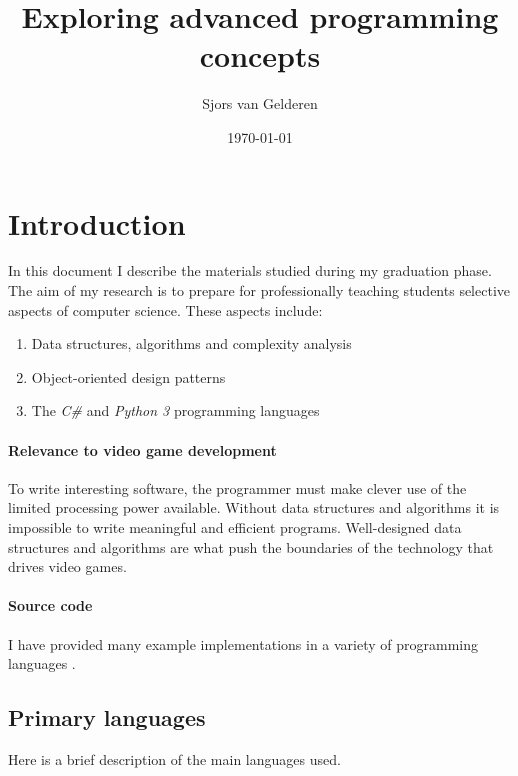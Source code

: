\documentclass{article}
\author{Sjors van Gelderen}
\title{Exploring advanced programming concepts}
\date{\today{}}
\begin{document}
\maketitle{}


\newpage


\tableofcontents{}


\newpage


\section{Introduction}
In this document I describe the materials studied during my graduation phase. The aim of my research is to prepare
for professionally teaching students selective aspects of computer science. These aspects include:
\begin{enumerate}
\item{Data structures, algorithms and complexity analysis}
\item{Object-oriented design patterns}
\item{The {\em C\#} and {\em Python 3} programming languages}
\end{enumerate}

\paragraph{Relevance to video game development}
To write interesting software, the programmer must make clever use of the limited processing power available. Without data
structures and algorithms it is impossible to write meaningful and efficient programs. Well-designed data structures and
algorithms are what push the boundaries of the technology that drives video games.

\paragraph{Source code}
I have provided many example implementations in a variety of programming languages \cite{repo}.




\subsection{Primary languages}
Here is a brief description of the main languages used.
\end{document}
